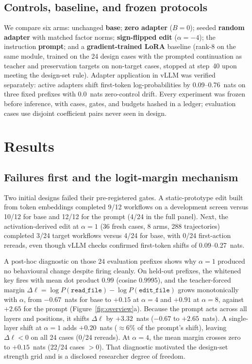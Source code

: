 \documentclass[11pt]{article}
\begin{document}
\subsection{Controls, baseline, and frozen protocols}
We compare six arms: unchanged \textbf{base}; \textbf{zero adapter} ($B=0$); seeded \textbf{random adapter} with matched factor norms; \textbf{sign-flipped edit} ($\alpha=-4$); the instruction \textbf{prompt}; and a \textbf{gradient-trained LoRA} baseline (rank-8 on the same module, trained on the 24 design cases with the prompted continuation as teacher and preservation targets on non-target cases, stopped at step~40 upon meeting the design-set rule). Adapter application in vLLM was verified separately: active adapters shift first-token log-probabilities by 0.09--0.76~nats on three fixed prefixes with 0.0~nats zero-control drift. Every experiment was frozen before inference, with cases, gates, and budgets hashed in a ledger; evaluation cases use disjoint coefficient pairs never seen in design.

\section{Results}\label{sec:results}
\subsection{Failures first and the logit-margin mechanism}
Two initial designs failed their pre-registered gates. A static-prototype edit built from token embeddings completed 9/12 workflows on a development screen versus 10/12 for base and 12/12 for the prompt (4/24 in the full panel). Next, the activation-derived edit at $\alpha=1$ (36 fresh cases, 8 arms, 288 trajectories) completed 3/24 target workflows versus 4/24 for base, with 0/24 first-action rereads, even though vLLM checks confirmed first-token shifts of 0.09--0.27~nats.

A post-hoc diagnostic on those 24 evaluation prefixes shows why $\alpha=1$ produced no behavioural change despite firing cleanly. On held-out prefixes, the whitened key fires with mean dot product $0.99$ (cosine $0.9995$), and the teacher-forced margin $\Delta \ell = \log P(\texttt{read\_file}) - \log P(\texttt{edit\_file})$ grows monotonically with $\alpha$, from $-0.67$~nats for base to $+0.15$ at $\alpha=4$ and $+0.91$ at $\alpha=8$, against $+2.65$ for the prompt (Figure~\ref{fig:overview}a). Because the prompt acts across all layers and positions, it shifts $\Delta\ell$ by $+3.32$~nats ($-0.67$ to $+2.65$~nats). A single-layer shift at $\alpha=1$ adds $+0.20$~nats ($\approx 6\%$ of the prompt's shift), leaving $\Delta \ell < 0$ on all 24 cases (0/24 rereads). At $\alpha=4$, the mean margin crosses zero to $+0.15$~nats (22/24 cases $>0$). That diagnostic motivated the design-set strength grid and is a disclosed researcher degree of freedom.
\end{document}
